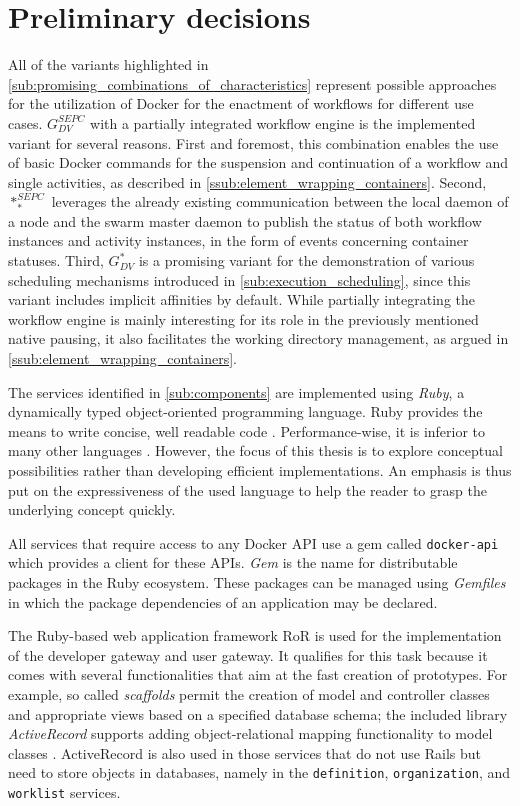 
\section{Preliminary decisions} %
\label{sec:design_decisions}
  All of the variants highlighted in \ref{sub:promising_combinations_of_characteristics} represent possible approaches for the utilization of Docker for the enactment of workflows for different use cases.
  $G_{DV}^{SEPC}$ with a partially integrated workflow engine is the implemented variant for several reasons. First and foremost, this combination enables the use of basic Docker commands for the suspension and continuation of a workflow and single activities, as described in \ref{ssub:element_wrapping_containers}. Second, $*_{*}^{SEPC}$ leverages the already existing communication between the local daemon of a node and the swarm master daemon to publish the status of both workflow instances and activity instances, in the form of events concerning container statuses. Third, $G_{DV}^{*}$ is a promising variant for the demonstration of various scheduling mechanisms introduced in \ref{sub:execution_scheduling}, since this variant includes implicit affinities by default. While partially integrating the workflow engine is mainly interesting for its role in the previously mentioned native pausing, it also facilitates the working directory management, as argued in \ref{ssub:element_wrapping_containers}.

  The services identified in \ref{sub:components} are implemented using \emph{Ruby}, a dynamically typed object-oriented programming language. Ruby provides the means to write concise, well readable code \cite[p.~782]{Nanz2015Comparative}. Performance-wise, it is inferior to many other languages \cite[p.~786]{Nanz2015Comparative}. However, the focus of this thesis is to explore conceptual possibilities rather than developing efficient implementations. An emphasis is thus put on the expressiveness of the used language to help the reader to grasp the underlying concept quickly.

  All services that require access to any Docker \ac{API} use a gem called \texttt{docker-api} which provides a client for these \acp{API}. \emph{Gem} is the name for distributable packages in the Ruby ecosystem. These packages can be managed using \emph{Gemfiles} in which the package dependencies of an application may be declared.

  The Ruby-based web application framework \ac{RoR} is used for the implementation of the developer gateway and user gateway. It qualifies for this task because it comes with several functionalities that aim at the fast creation of prototypes. For example, so called \emph{scaffolds} permit the creation of model and controller classes and appropriate views based on a specified database schema; the included library \emph{ActiveRecord} supports adding object-relational mapping functionality to model classes \cite[p.~5]{Jazayeri2007Some}. ActiveRecord is also used in those services that do not use Rails but need to store objects in databases, namely in the \texttt{definition}, \texttt{organization}, and \texttt{worklist} services.

